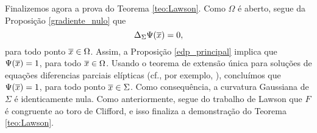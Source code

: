 Finalizemos agora a prova do Teorema \ref{teo:Lawson}. Como
$\Omega$ \'e aberto, segue da Proposi\c c\~ao \ref{gradiente_nulo}
que
\[
\Delta_\Sigma\Psi(\overline{x})=0,
\]
para todo ponto $\overline{x}\in\Omega$. Assim, a Proposi\c c\~ao 
\ref{edp_principal} implica que $\Psi(\overline{x})=1$, para todo
$\overline{x}\in\Omega$. Usando o teorema de extens\~ao \'unica
para solu\c c\~oes de equa\c c\~oes diferencias parciais
el\'ipticas (cf., por exemplo, \cite{Aronszajn1957}), conclu\'imos
que $\Psi(\overline{x})=1$, para todo ponto $\overline{x}\in\Sigma$. Como
consequ\^encia, a curvatura Gaussiana de $\Sigma$ \'e
identicamente nula. Como anteriormente, segue do trabalho
de Lawson \cite{Lawson1969} que $F$ \'e congruente ao
toro de Clifford, e isso finaliza a demonstra\c c\~ao do
Teorema \ref{teo:Lawson}.